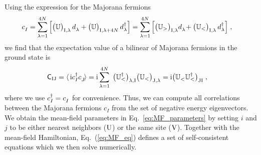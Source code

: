 Using the expression for the Majorana fermions
\begin{align}%
    c_I^{\phantom{\dagger}} &= \sum_{\lambda=1}^{ 4  {N}} \Big[  \big( \mathbb{U} \big)_{\I,\lambda} \, d_\lambda^{\phantom{\dagger}} +    \big( \mathbb{U} \big)_{\I,\lambda+4 {N}}  \, d_\lambda^\dagger \Big]
    =
    \sum_{\lambda=1}^{ 4  {N}} \Big[  \big( \mathbb{U}_{>} \big)_{\I,\lambda}  d_\lambda^{\phantom{\dagger}} \!+    \big( \mathbb{U}_{<} \big)_{\I,\lambda}  \, d_\lambda^\dagger \Big]
    \; ,
\end{align}
we find that the expectation value of a bilinear of Majorana fermions in the ground state is
\begin{equation}
\begin{split}
    {\mathsf{C}}_{\I\J}%
    =    \braket{ \,  \im c_I^{\dagger} c_J^{\phantom{\dagger}}  \! }
    &= \im
    \sum_{\lambda=1}^{ 4  {N}} \;  \big( \mathbb{U}^{\dagger}_{<} \big)_{\lambda,\I} \big( \mathbb{U}_{<} \big)_{\J,\lambda}
    = \im\big(\mathbb{U}_{<}^{\pd}  \mathbb{U}_{<}^\dagger  \big)_{\J\I} \; , \label{eq:MF_eq}
\end{split}
\end{equation}
where we use $c_I^{\dagger}=c_I^{\pd}$ for convenience.
Thus, we can compute all correlations between the Majorana fermions $c_I$ from the set of negative energy eigenvectors.
We obtain the mean-field parameters in Eq.~\eqref{eq:MF_parameters} by setting $i$ and $j$ to be either nearest neighbors ($\mathrm{U}$) or the same site ($\mathrm{V}$). Together with the mean-field Hamiltonian, Eq.~(\ref{eq:MF_eq}) defines a set of self-consistent equations which we then solve numerically.

